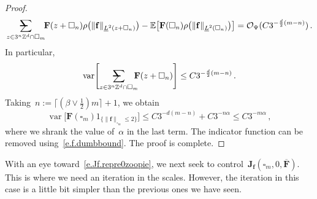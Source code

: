 \documentclass[11pt]{article} %
\makeatletter
\let\oldsquare\square %
\renewcommand{\square}{\oldsquare}
\numberwithin{equation}{section}
\theoremstyle{definition}
\newcommand*{\Z}{\ensuremath{\mathbb{Z}}}
\newcommand{\f}{\mathbf{f}}
\newcommand{\cu}{\square}
\newcommand{\E}{\mathbb{E}}
\renewcommand{\O}{\mathcal{O}}
\newcommand{\indc}{1}
\DeclareMathOperator{\var}{var}
\newcommand{\avsum}{\mathop{\mathpalette\avsuminner\relax}\displaylimits}
\newcommand\avsuminner[2]{%
  {\sbox0{$\m@th#1\sum$}%
   \vphantom{\usebox0}%
   \ooalign{%
     \hidewidth
     \smash{\,\rule[.23em]{8.8pt}{1.1pt} \relax}%
     \hidewidth\cr
     $\m@th#1\sum$\cr
   }%
  }%
}
\newcommand{\bfJ}{\mathbf{J}}
\newcommand{\bfF}{\mathbf{F}}
\makeatother
\begin{document}
\begin{proof}
\begin{equation*}
\avsum_{z \in 3^n \Z^d \cap \cu_m} \!\!  \bfF(z+\cu_n)  \rho\bigl( \| \f \|_{\underline{L}^2(z+\cu_n)} \bigr)
-
\E \bigl[ \bfF(\cu_n)  \rho\bigl( \| \f \|_{\underline{L}^2(\cu_n)} \bigr) \bigr] 
=
\O_\Psi (C3^{-\frac d2(m-n)}) \,.
\end{equation*}
In particular, 
\begin{equation*}
\var \Biggl[ \avsum_{z \in 3^n \Z^d \cap \cu_m} \!\!\!\!  \bfF(z+\cu_n)  \Biggr]
\leq 
C3^{-\frac d2(m-n)}\,.
\end{equation*}
Taking~$n:= \lceil (\beta \vee \tfrac12) m \rceil+1$, we obtain
\begin{equation*}
\var \bigl[ \bfF(\cu_m) \indc_{\{ \| \f \|_{\cu_m} \leq 2 \}} \bigr] 
\leq 
C3^{-d(m-n)}
+
C3^{-n\alpha} 
\leq 
C3^{-m\alpha}\,,
\end{equation*}
where we shrank the value of~$\alpha$ in the last term. 
The indicator function can be removed using~\eqref{e.f.dumbbound}. 
The proof is complete. 
\end{proof}

With an eye toward~\eqref{e.Jf.repre0zoopie}, we next seek to control~$\bfJ_\f(\cu_{m},0,\overline{\bfF})$. This is where we need an iteration in the scales. However, the iteration in this case is a little bit simpler than the previous ones we have seen.
\end{document}

